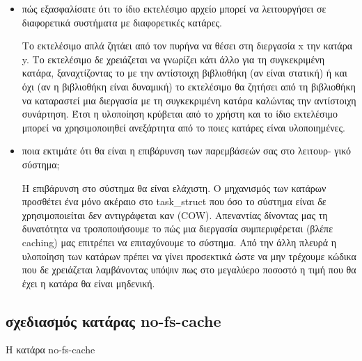 \documentclass[a4paper,10pt]{article} \usepackage{anysize}
\begin{document}
\begin{itemize}
    \item πώς εξασφαλίσατε ότι το ίδιο εκτελέσιμο αρχείο μπορεί να λειτουργήσει σε
        διαφορετικά συστήματα με διαφορετικές κατάρες.

        Το εκτελέσιμο απλά ζητάει από τον πυρήνα να θέσει στη διεργασία x την
        κατάρα y. Το εκτελέσιμο δε χρειάζεται να γνωρίζει κάτι άλλο για τη
        συγκεκριμένη κατάρα, ξαναχτίζοντας το με την αντίστοιχη βιβλιοθήκη (αν
        είναι στατική) ή και όχι (αν η βιβλιοθήκη είναι δυναμική) το
        εκτελέσιμο θα ζητήσει από τη βιβλιοθήκη να καταραστεί μια διεργασία με
        τη συγκεκριμένη κατάρα καλώντας την αντίστοιχη συνάρτηση. Έτσι η
        υλοποίηση κρύβεται από το χρήστη και το ίδιο εκτελέσιμο μπορεί να
        χρησιμοποιηθεί ανεξάρτητα από το ποιες κατάρες είναι υλοποιημένες.

    \item ποια εκτιμάτε ότι θα είναι η επιβάρυνση των παρεμβάσεών σας στο λειτουρ-
        γικό σύστημα;

        Η επιβάρυνση στο σύστημα θα είναι ελάχιστη. Ο μηχανισμός των κατάρων
        προσθέτει ένα μόνο ακέραιο στο task\_struct που όσο το σύστημα είναι
        δε χρησιμοποιείται δεν αντιγράφεται καν (COW). Απεναντίας δίνοντας μας
        τη δυνατότητα να τροποποιήσουμε το πώς μια διεργασία συμπεριφέρεται
        (βλέπε caching) μας επιτρέπει να επιταχύνουμε το σύστημα. Από την άλλη
        πλευρά η υλοποίηση των κατάρων πρέπει να γίνει προσεκτικά ώστε να μην
        τρέχουμε κώδικα που δε χρειάζεται λαμβάνοντας υπόψιν πως στο μεγαλύερο
        ποσοστό η τιμή που θα έχει η κατάρα θα είναι μηδενική.

\end{itemize}
\subsection*{σχεδιασμός κατάρας no-fs-cache}
Η κατάρα no-fs-cache 
\end{document}
